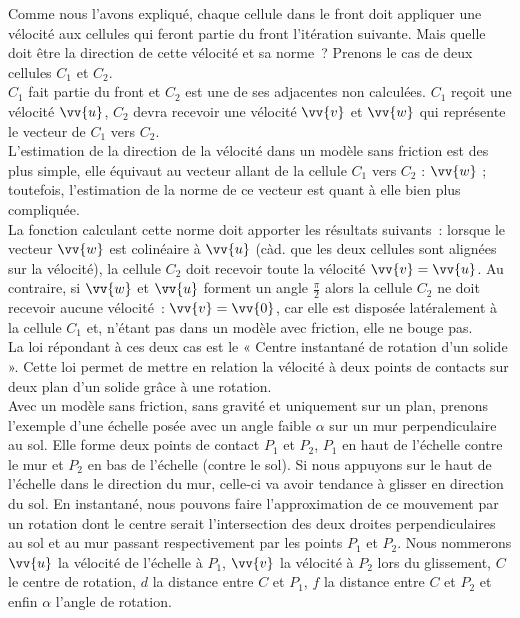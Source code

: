 \documentclass[a4paper,11pt]{article}
\begin{document}
Comme nous l'avons expliqué, chaque cellule dans le front doit appliquer une vélocité aux cellules qui feront partie du front l'itération suivante.
Mais quelle doit être la direction de cette vélocité et sa norme~?
Prenons le cas de deux cellules $C_1$ et $C_2$.\\
$C_1$ fait partie du front et $C_2$ est une de ses adjacentes non calculées. $C_1$ reçoit une vélocité $\vv{u}$, $C_2$ devra recevoir une vélocité $\vv{v}$ et $\vv{w}$ qui représente le vecteur de $C_1$ vers $C_2$.\\
L'estimation de la direction de la vélocité dans un modèle sans friction est des plus simple, elle équivaut au vecteur allant de la cellule $C_1$ vers $C_2$ : $\vv{w}$ ; toutefois, l'estimation de la norme de ce vecteur est quant à elle bien plus compliquée.\\
La fonction calculant cette norme doit apporter les résultats suivants~:
lorsque le vecteur $\vv{w}$ est colinéaire à $\vv{u}$ (càd. que les deux cellules sont alignées sur la vélocité), la cellule $C_2$ doit recevoir toute la vélocité $\vv{v} = \vv{u}$. Au contraire, si $\vv{w}$ et $\vv{u}$ forment un angle $\frac{\pi}{2}$ alors la cellule $C_2$ ne doit recevoir aucune vélocité~: $\vv{v} = \vv{0}$, car elle est disposée latéralement à la cellule $C_1$ et, n'étant pas dans un modèle avec friction, elle ne bouge pas. \\
La loi répondant à ces deux cas est le « Centre instantané de rotation d'un solide ».
Cette loi permet de mettre en relation la vélocité à deux points de contacts sur deux plan d'un solide grâce à une rotation. \\
Avec un modèle sans friction, sans gravité et uniquement sur un plan, prenons l'exemple d'une échelle posée avec un angle faible $\alpha$ sur un mur perpendiculaire au sol. Elle forme deux points de contact $P_1$ et $P_2$, $P_1$ en haut de l'échelle contre le mur et $P_2$ en bas de l'échelle (contre le sol).
Si nous appuyons sur le haut de l'échelle dans le direction du mur, celle-ci va avoir tendance à glisser en direction du sol.
En instantané, nous pouvons faire l'approximation de ce mouvement par un rotation dont le centre serait l'intersection des deux droites perpendiculaires au sol et au mur passant respectivement par les points $P_1$ et $P_2$.
Nous nommerons $\vv{u}$ la vélocité de l'échelle à $P_1$, $\vv{v}$ la vélocité à $P_2$ lors du glissement, $C$ le centre de rotation, $d$ la distance entre $C$ et $P_1$, $f$ la distance entre $C$ et $P_2$ et enfin $\alpha$ l'angle de rotation.
\end{document}
